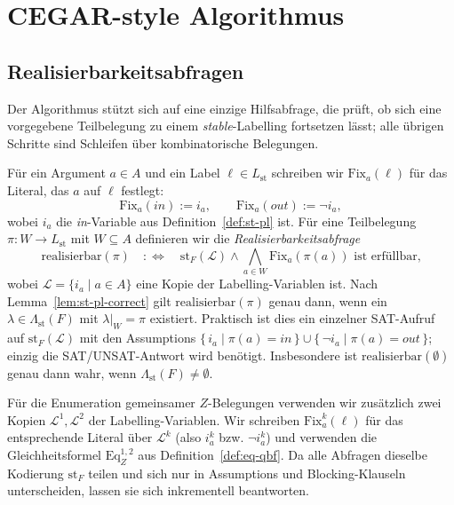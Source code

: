 \section{CEGAR-style Algorithmus}
\label{cegar-alg}

\subsection{Realisierbarkeitsabfragen}
\label{subsec:singl-realize}

Der Algorithmus stützt sich auf eine einzige Hilfsabfrage, die prüft, ob sich
eine vorgegebene Teilbelegung zu einem \textit{stable}-Labelling fortsetzen
lässt; alle übrigen Schritte sind Schleifen über kombinatorische Belegungen.

Für ein Argument \(a\in A\) und ein Label \(\ell\in L_{\mathrm{st}}\) schreiben
wir \(\mathrm{Fix}_a(\ell)\) für das Literal, das \(a\) auf \(\ell\) festlegt:
\[
    \mathrm{Fix}_a(\mathit{in}):=i_a,
    \qquad
    \mathrm{Fix}_a(\mathit{out}):=\neg i_a,
\]
wobei \(i_a\) die \textit{in}-Variable aus Definition~\ref{def:st-pl} ist. Für
eine Teilbelegung \(\pi:W\to L_{\mathrm{st}}\) mit \(W\subseteq A\) definieren
wir die \emph{Realisierbarkeitsabfrage}
\[
    \mathrm{realisierbar}(\pi)
    \quad:\Longleftrightarrow\quad
    \mathrm{st}_F(\mathcal L)\land
    \bigwedge_{a\in W}\mathrm{Fix}_a(\pi(a))
    \text{ ist erfüllbar,}
\]
wobei \(\mathcal L=\{i_a\mid a\in A\}\) eine Kopie der Labelling-Variablen ist.
Nach Lemma~\ref{lem:st-pl-correct} gilt \(\mathrm{realisierbar}(\pi)\) genau
dann, wenn ein \(\lambda\in\Lambda_{\mathrm{st}}(F)\) mit \(\lambda|_W=\pi\)
existiert. Praktisch ist dies ein einzelner SAT-Aufruf auf
\(\mathrm{st}_F(\mathcal L)\) mit den Assumptions
\(\{\,i_a\mid \pi(a)=\mathit{in}\,\}\cup
\{\,\neg i_a\mid \pi(a)=\mathit{out}\,\}\); einzig die SAT/UNSAT-Antwort wird
benötigt. Insbesondere ist \(\mathrm{realisierbar}(\emptyset)\) genau dann
wahr, wenn \(\Lambda_{\mathrm{st}}(F)\neq\emptyset\).

Für die Enumeration gemeinsamer \(Z\)-Belegungen verwenden wir zusätzlich zwei
Kopien \(\mathcal L^1,\mathcal L^2\) der Labelling-Variablen. Wir schreiben
\(\mathrm{Fix}^k_a(\ell)\) für das entsprechende Literal über \(\mathcal L^k\)
(also \(i_a^k\) bzw. \(\neg i_a^k\)) und verwenden die Gleichheitsformel
\(\mathrm{Eq}^{1,2}_Z\) aus Definition~\ref{def:eq-qbf}. Da alle Abfragen
dieselbe Kodierung \(\mathrm{st}_F\) teilen und sich nur in Assumptions und
Blocking-Klauseln unterscheiden, lassen sie sich inkrementell beantworten.

